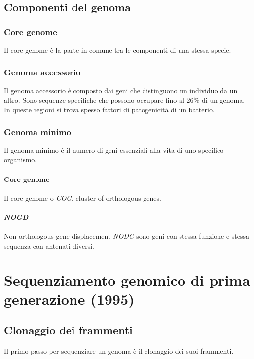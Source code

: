 	\subsection{Componenti del genoma}

		\subsubsection{Core genome}
		Il core genome \`e la parte in comune tra le componenti di una stessa specie.

		\subsubsection{Genoma accessorio}
		Il genoma accessorio \`e composto dai geni che distinguono un individuo da un altro.
		Sono sequenze specifiche che possono occupare fino al $26\%$ di un genoma.
		In queste regioni si trova spesso fattori di patogenicit\`a di un batterio.

		\subsubsection{Genoma minimo}
		Il genoma minimo \`e il numero di geni essenziali alla vita di uno specifico organismo. 

			\paragraph{Core genome}
			Il core genome o \emph{COG}, cluster of orthologous genes.

			\paragraph{\emph{NOGD}}
			Non orthologous gene displacement \emph{NODG} sono geni con stessa funzione e stessa sequenza con antenati diversi.

\section{Sequenziamento genomico di prima generazione (1995)}

	\subsection{Clonaggio dei frammenti}
	Il primo passo per sequenziare un genoma \`e il clonaggio dei suoi frammenti.

